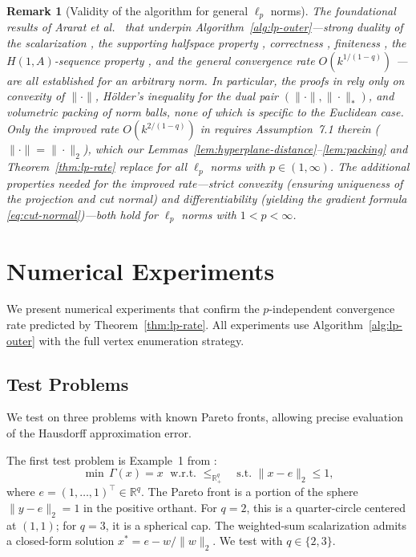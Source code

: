 \documentclass[11pt]{article}
\newtheorem{remark}{Remark}
\newcommand{\R}{\mathbb{R}}
\begin{document}
\begin{remark}[Validity of the algorithm for general $\ell_p$ norms]\label{rem:general-lp-validity}
The foundational results of Ararat et al.\ \cite{Ararat2024} that underpin Algorithm~\ref{alg:lp-outer}---strong duality of the scalarization \cite[Proposition~3.2]{Ararat2024}, the supporting halfspace property \cite[Proposition~3.6]{Ararat2024}, correctness \cite[Theorem~4.5]{Ararat2024}, finiteness \cite[Theorem~5.2]{Ararat2024}, the $H(1,A)$-sequence property \cite[Corollary~6.5]{Ararat2024}, and the general convergence rate $O(k^{1/(1-q)})$ \cite[Corollary~6.10]{Ararat2024}---are all established for an arbitrary norm. In particular, the proofs in \cite[Sections~3--6]{Ararat2024} rely only on convexity of $\|\cdot\|$, H\"older's inequality for the dual pair $(\|\cdot\|, \|\cdot\|_*)$, and volumetric packing of norm balls, none of which is specific to the Euclidean case. Only the improved rate $O(k^{2/(1-q)})$ in \cite[Section~7]{Ararat2024} requires Assumption~7.1 therein ($\|\cdot\| = \|\cdot\|_2$), which our Lemmas~\ref{lem:hyperplane-distance}--\ref{lem:packing} and Theorem~\ref{thm:lp-rate} replace for all $\ell_p$ norms with $p \in (1,\infty)$. The additional properties needed for the improved rate---strict convexity (ensuring uniqueness of the projection and cut normal) and differentiability (yielding the gradient formula \eqref{eq:cut-normal})---both hold for $\ell_p$ norms with $1 < p < \infty$.
\end{remark}

\section{Numerical Experiments}\label{sec:experiments}

We present numerical experiments that confirm the $p$-independent convergence rate predicted by Theorem~\ref{thm:lp-rate}. All experiments use Algorithm~\ref{alg:lp-outer} with the full vertex enumeration strategy.

\subsection{Test Problems}\label{sec:test-problems}

We test on three problems with known Pareto fronts, allowing precise evaluation of the Hausdorff approximation error.

The first test problem is Example~1 from \cite[Section~8]{Ararat2024}:
\begin{equation}\label{eq:example1}
\min\, \Gamma(x) = x \;\text{ w.r.t.\ } \le_{\R^q_+} \quad \text{s.t. } \|x - e\|_2 \le 1,
\end{equation}
where $e = (1, \ldots, 1)^\top \in \R^q$. The Pareto front is a portion of the sphere $\|y - e\|_2 = 1$ in the positive orthant. For $q = 2$, this is a quarter-circle centered at $(1,1)$; for $q = 3$, it is a spherical cap. The weighted-sum scalarization admits a closed-form solution $x^* = e - w/\|w\|_2$. We test with $q \in \{2, 3\}$.
\end{document}
